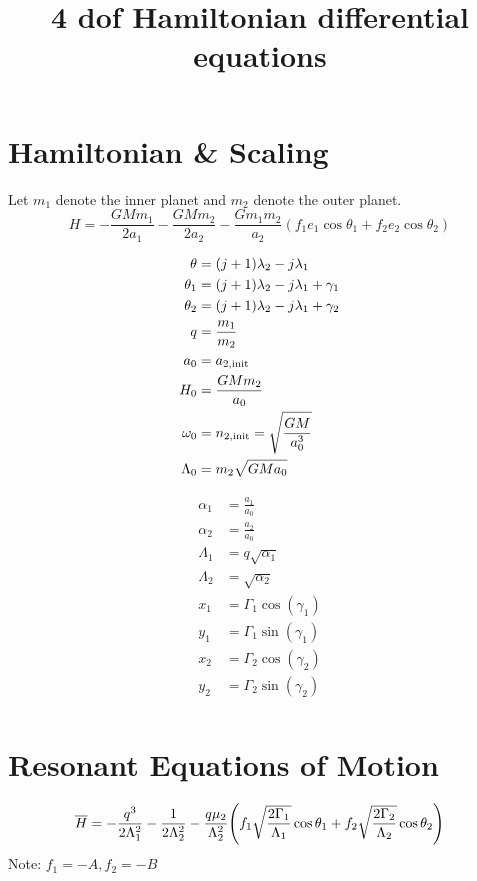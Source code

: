 \documentclass[12pt]{article}
\title{4 dof Hamiltonian differential equations}
\newcommand{\note}[1]{{\color{red} #1 }}
\DeclarePairedDelimiter{\p}{(}{)}
\begin{document}
\maketitle
\section{Hamiltonian \& Scaling}
Let $m_1$ denote the inner planet and $m_2$ denote the outer planet.
\begin{equation}
H=-\frac{G M m_{1}}{2 a_{1}}-\frac{G M m_{2}}{2 a_{2}}
-\frac{G m_{1} m_{2}}{a_{2}}  \left(f_{1} e_{1} \cos \theta_{1} 
+f_{2} e_{2} \cos \theta_{2}\right)
\end{equation}

\begin{align*}
  \theta &= (j+1)\lambda_2 - j\lambda_1\\
  \theta_1 &= (j+1)\lambda_2 - j\lambda_1+\gamma_1\\
  \theta_2 &= (j+1)\lambda_2 - j\lambda_1+\gamma_2\\
  q &= \frac{m_1}{m_2}\\
  a_0&= a_{2,\rm init} \\
  H_0 &= \frac{GMm_2}{a_0}\\
  \omega_0 &= n_{2,\rm init} = \sqrt{\frac{GM}{a_0^3}}\\
  \Lambda_0 &= m_2\sqrt{GMa_0}
\end{align*}

\begin{align*}
  \alpha_1 &= \frac{a_1}{a_0}\\
  \alpha_2 &= \frac{a_2}{a_0}\\
  \Lambda_1 &= q\sqrt{\alpha_1}\\
  \Lambda_2 &= \sqrt{\alpha_2}\\
  x_1 &= \Gamma_1\cos(\gamma_1)\\ 
  y_1 &= \Gamma_1\sin(\gamma_1)\\ 
  x_2 &= \Gamma_2\cos(\gamma_2)\\ 
  y_2 &= \Gamma_2\sin(\gamma_2)\\ 
\end{align*}


\section{Resonant Equations of Motion}
\begin{equation}
  \label{eq:2}
  \overline{H} = -\frac{q^3}{2\Lambda_1^2} -\frac{1}{2\Lambda_2^2} - \frac{q\mu_2}{\Lambda_2^2}\p*{ f_1 \sqrt{\frac{2\Gamma_1}{\Lambda_1}}\cos\theta_1 + f_2\sqrt{\frac{2\Gamma_2}{\Lambda_2}}\cos\theta_2}
\end{equation}
\note{Note: $f_1 = -A, f_2 = -B$}
\end{document}
